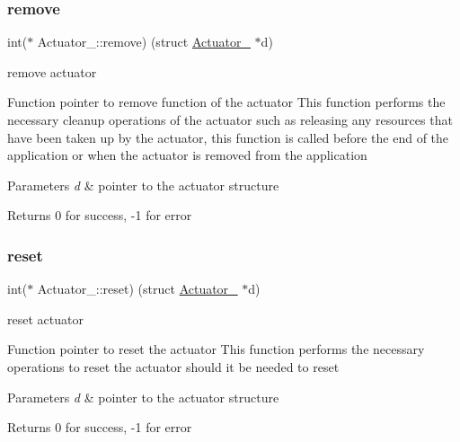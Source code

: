 \subsubsection{\texorpdfstring{remove}{remove}}
{\footnotesize\ttfamily int($\ast$ Actuator\+\_\+\+::remove) (struct \hyperlink{struct_actuator__}{Actuator\+\_\+} $\ast$d)}



remove actuator 

Function pointer to remove function of the actuator This function performs the necessary cleanup operations of the actuator such as releasing any resources that have been taken up by the actuator, this function is called before the end of the application or when the actuator is removed from the application 
\begin{DoxyParams}{Parameters}
{\em d} & pointer to the actuator structure \\
\hline
\end{DoxyParams}
\begin{DoxyReturn}{Returns}
0 for success, -\/1 for error 
\end{DoxyReturn}
\mbox{\label{struct_actuator___a4a10f32cb9795a3cc9f18be797a2fd8e}} 
\subsubsection{\texorpdfstring{reset}{reset}}
{\footnotesize\ttfamily int($\ast$ Actuator\+\_\+\+::reset) (struct \hyperlink{struct_actuator__}{Actuator\+\_\+} $\ast$d)}



reset actuator 

Function pointer to reset the actuator This function performs the necessary operations to reset the actuator should it be needed to reset 
\begin{DoxyParams}{Parameters}
{\em d} & pointer to the actuator structure \\
\hline
\end{DoxyParams}
\begin{DoxyReturn}{Returns}
0 for success, -\/1 for error 
\end{DoxyReturn}
\mbox{\label{struct_actuator___ad94f7d72b09f1a8ccc779a082a685026}} 
